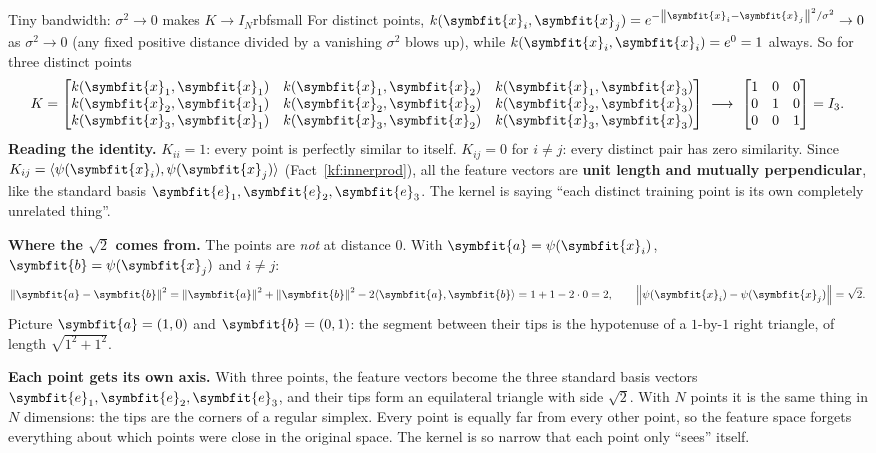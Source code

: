 \documentclass[11pt]{article}
\newcommand{\bm}[1]{\symbfit{#1}}
\newcommand{\vx}{\bm{x}}
\newcommand{\norm}[1]{\left\lVert #1\right\rVert}
\begin{document}
\begin{example}{Tiny bandwidth: $\sigma^2\to0$ makes $K\to I_N$}{rbfsmall}
For distinct points, $k(\vx_i,\vx_j)=e^{-\norm{\vx_i-\vx_j}^2/\sigma^2}\to0$ as $\sigma^2\to0$ (any fixed positive distance divided by a vanishing $\sigma^2$
blows up), while $k(\vx_i,\vx_i)=e^0=1$ always. So for three distinct points
\[
K=\begin{bmatrix}k(\vx_1,\vx_1)&k(\vx_1,\vx_2)&k(\vx_1,\vx_3)\\k(\vx_2,\vx_1)&k(\vx_2,\vx_2)&k(\vx_2,\vx_3)\\k(\vx_3,\vx_1)&k(\vx_3,\vx_2)&k(\vx_3,\vx_3)\end{bmatrix}
\ \longrightarrow\ \begin{bmatrix}1&0&0\\0&1&0\\0&0&1\end{bmatrix}=I_3 .
\]
\textbf{Reading the identity.} $K_{ii}=1$: every point is perfectly similar to itself. $K_{ij}=0$ for $i\ne j$: every distinct pair has zero
similarity. Since $K_{ij}=\langle\psi(\vx_i),\psi(\vx_j)\rangle$ (Fact~\ref{kf:innerprod}), all the feature vectors are \textbf{unit length and mutually
perpendicular}, like the standard basis $\bm e_1,\bm e_2,\bm e_3$. The kernel is saying ``each distinct training point is its own
completely unrelated thing''.

\textbf{Where the $\sqrt2$ comes from.} The points are \emph{not} at distance $0$. With $\bm a=\psi(\vx_i)$, $\bm b=\psi(\vx_j)$ and $i\ne j$:
\[
\norm{\bm a-\bm b}^2=\norm{\bm a}^2+\norm{\bm b}^2-2\langle\bm a,\bm b\rangle=1+1-2\cdot0=2,\qquad \norm{\psi(\vx_i)-\psi(\vx_j)}=\sqrt2 .
\]
Picture $\bm a=(1,0)$ and $\bm b=(0,1)$: the segment between their tips is the hypotenuse of a $1$-by-$1$ right triangle, of length $\sqrt{1^2+1^2}$.

\textbf{Each point gets its own axis.} With three points, the feature vectors become the three standard basis vectors
$\bm e_1,\bm e_2,\bm e_3$, and their tips form an equilateral triangle with side $\sqrt2$. With $N$ points it is the same thing in
$N$ dimensions: the tips are the corners of a regular simplex. Every point is equally far from every other point, so the
feature space forgets everything about which points were close in the original space. The kernel is so narrow that each
point only ``sees'' itself.
\begin{center}
\end{center}
\end{example}
\end{document}
